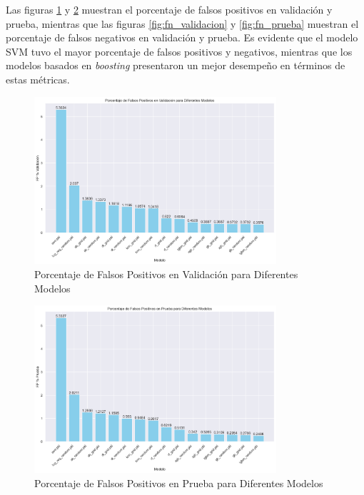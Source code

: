 Las figuras \ref{fig:fp_validacion} y \ref{fig:fp_prueba} muestran el porcentaje de falsos positivos en validación y prueba, mientras que las figuras \ref{fig:fn_validacion} y \ref{fig:fn_prueba} muestran el porcentaje de falsos negativos en validación y prueba. Es evidente que el modelo SVM tuvo el mayor porcentaje de falsos positivos y negativos, mientras que los modelos basados en \textit{boosting} presentaron un mejor desempeño en términos de estas métricas.

\begin{figure}[H]
    \centering
    \includegraphics[width=0.8\textwidth]{positivosValidacion.png}
    \caption{Porcentaje de Falsos Positivos en Validación para Diferentes Modelos}
    \label{fig:fp_validacion}
\end{figure}

\begin{figure}[H]
    \centering
    \includegraphics[width=0.8\textwidth]{positivosPrueba.png}
    \caption{Porcentaje de Falsos Positivos en Prueba para Diferentes Modelos}
    \label{fig:fp_prueba}
\end{figure}

